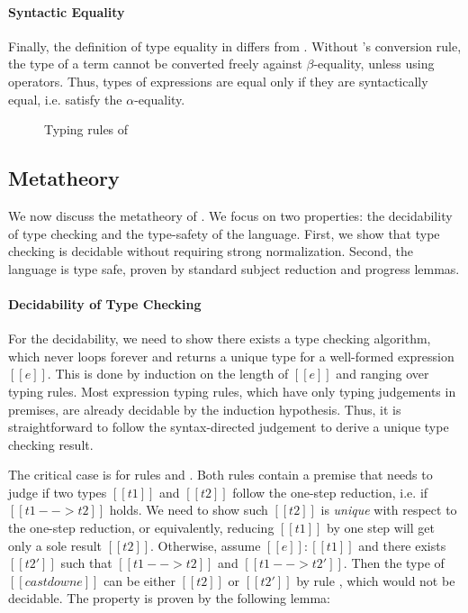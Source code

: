 \paragraph{Syntactic Equality}
Finally, the definition of type equality in \ecore differs from
\cc. Without \cc's conversion rule, the type of a term cannot be
converted freely against $\beta$-equality, unless using \cast
operators. Thus, types of expressions are equal only if they are
syntactically equal, i.e. satisfy the $\alpha$-equality.

\begin{figure}
    \ottdefnctx{}\ottinterrule
    \ottdefnexpr{}
    \caption{Typing rules of \ecore}
    \label{fig:ecore:typing}
\end{figure}

\subsection{Metatheory}\label{sec:ecore:meta}
We now discuss the metatheory of \ecore. We focus on two properties: the
decidability of type checking and the type-safety of the language. First, we
show that type checking \ecore is decidable without requiring strong
normalization. Second, the
language is type safe, proven by standard subject reduction and progress
lemmas.

\paragraph{Decidability of Type Checking}
For the decidability, we need to show there exists a type checking algorithm,
which never loops forever and returns a unique type for a well-formed
expression $[[e]]$. This is done by induction on the length of $[[e]]$ and
ranging over typing rules. Most expression typing rules, which have only typing
judgements in premises, are already decidable by the induction hypothesis. Thus, it
is straightforward to follow the syntax-directed judgement to derive a unique
type checking result.

The critical case is for rules  and .
Both rules contain a premise that needs to judge if two types $[[t1]]$ and
$[[t2]]$ follow the one-step reduction, i.e. if $[[t1 --> t2]]$ holds. We need
to show such $[[t2]]$ is \emph{unique} with respect to the one-step reduction,
or equivalently, reducing $[[t1]]$ by one step will get only a sole result
$[[t2]]$. Otherwise, assume $[[e]]:[[t1]]$ and there exists $[[t2']]$ such that
$[[t1 --> t2]]$ and $[[t1 --> t2']]$. Then the type of $[[castdown e]]$ can be
either $[[t2]]$ or $[[t2']]$ by rule , which
would not be
decidable. The property is proven by the following lemma:

